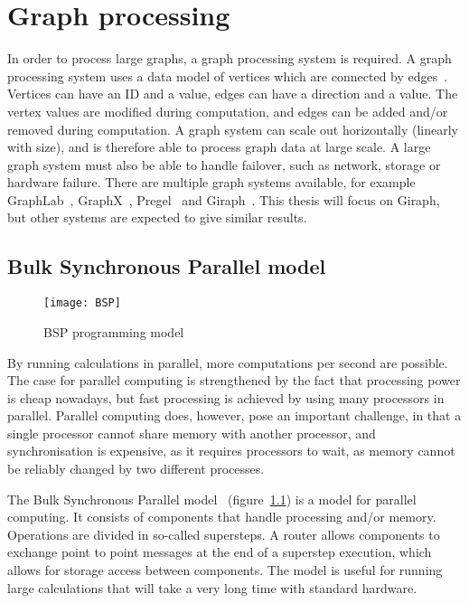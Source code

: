 \chapter{Graph processing}
\label{chp:graph}

In order to process large graphs, a graph processing system is required.
A graph processing system uses a data model of vertices which are connected by edges~\cite{sakr2013processing}.
Vertices can have an ID and a value, edges can have a direction and a value.
The vertex values are modified during computation, and edges can be added and/or removed during computation.
A graph system can scale out horizontally (linearly with size), and is therefore able to process graph data at large scale.
A large graph system must also be able to handle failover, such as network, storage or hardware failure.
There are multiple graph systems available,
 for example GraphLab~\cite{low2010graphlab}, 
 GraphX~\cite{xin2013graphx}, 
 Pregel~\cite{Malewicz:2010:PSL:1807167.1807184} 
 and Giraph~\cite{avery2011giraph,ching2013scaling}.
This thesis will focus on Giraph,
 but other systems are expected to give similar results.

\section{Bulk Synchronous Parallel model}
\label{sec:bsp}

\begin{figure}[h]
	\caption{BSP programming model~\cite{sakr2013processing}}
	\label{fig:BSP}
	\centering
		\texttt{[image: BSP]}
\end{figure}

By running calculations in parallel, more computations per second are possible.
The case for parallel computing is strengthened by the fact that processing power is cheap nowadays,
 but fast processing is achieved by using many processors in parallel.
Parallel computing does, however, pose an important challenge,
 in that a single processor cannot share memory with another processor, and synchronisation is expensive,
 as it requires processors to wait, as memory cannot be reliably changed by two different processes.

The Bulk Synchronous Parallel model~\cite{Valiant:1990:BMP:79173.79181} (figure~\ref{fig:BSP}) is a model for parallel computing.
It consists of components that handle processing and/or memory.
Operations are divided in so-called supersteps.
A router allows components to exchange point to point messages at the end of a superstep execution,
 which allows for storage access between components.
The model is useful for running large calculations that will take a very long time with standard hardware.

